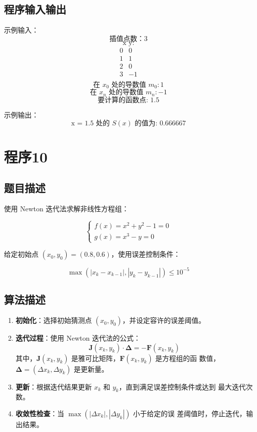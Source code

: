 \documentclass[b5paper;twoside]{article}
\begin{document}
\subsection{程序输入输出}

示例输入：
\[
\text{插值点数：3}
\]
\[
\text{x y:}
\]
\[
\begin{array}{cc}
	0 & 0 \\
	1 & 1 \\
	2 & 0 \\
	3 & -1 \\
\end{array}
\]
\[
\text{在 } x_0 \text{ 处的导数值 } m_0: 1
\]
\[
\text{在 } x_n \text{ 处的导数值 } m_n: -1
\]
\[
\text{要计算的函数点: } 1.5
\]

示例输出：
\[
\text{x = 1.5 处的 } S(x) \text{ 的值为: } 0.666667
\]


\section{程序10}

\subsection{题目描述}

使用 Newton 迭代法求解非线性方程组：

\[
\begin{cases}
	f(x) = x^2 + y^2 - 1 = 0 \\
	g(x) = x^3 - y = 0
\end{cases}
\]

给定初始点 $(x_0, y_0) = (0.8, 0.6)$，使用误差控制条件：

\[
\max(|x_k - x_{k-1}|, |y_k - y_{k-1}|) \leq 10^{-5}
\]

\subsection{算法描述}

\begin{enumerate}
	\item \textbf{初始化}：选择初始猜测点 $(x_0, y_0)$，并设定容许的误差阈值。
	\item \textbf{迭代过程}：使用 Newton 迭代法的公式：
	\[
	\mathbf{J}(x_k, y_k) \cdot \mathbf{\Delta} = -\mathbf{F}(x_k, y_k)
	\]
	其中，$\mathbf{J}(x_k, y_k)$ 是雅可比矩阵，$\mathbf{F}(x_k, y_k)$ 是方程组的函
	数值，$\mathbf{\Delta} = (\Delta x_k, \Delta y_k)$ 是更新量。
	\item \textbf{更新}：根据迭代结果更新 $x_k$ 和 $y_k$，直到满足误差控制条件或达到
	最大迭代次数。
	\item \textbf{收敛性检查}：当 $\max(|\Delta x_k|, |\Delta y_k|)$ 小于给定的误
	差阈值时，停止迭代，输出结果。
\end{enumerate}
\end{document}
